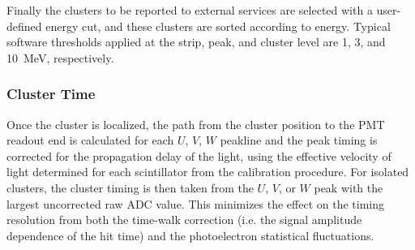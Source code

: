 Finally the clusters to be reported to external services are selected with a user-defined energy cut, and these
clusters are sorted according to energy. Typical software thresholds applied at the strip, peak, and cluster level
are 1, 3, and 10~MeV, respectively.

\subsubsection {Cluster Time}

Once the cluster is localized, the path from the cluster position to the PMT readout end is calculated for each
$U$, $V$, $W$ peakline and the peak timing is corrected for the propagation delay of the light, using the effective
velocity of light determined for each scintillator from the calibration procedure. For isolated clusters, the cluster
timing is then taken from the $U$, $V$, or $W$ peak with the largest uncorrected raw ADC value. This minimizes
the effect on the timing resolution from both the time-walk correction (i.e. the signal amplitude dependence of the
hit time) and the photoelectron statistical fluctuations.

